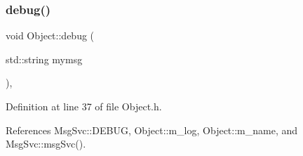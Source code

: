 \mbox{\label{classObject_aac010553f022165573714b7014a15f0d}} 
\subsubsection{\texorpdfstring{debug()}{debug()}\hspace{0.1cm}{\footnotesize\ttfamily [1/2]}}
{\footnotesize\ttfamily void Object\+::debug (\begin{DoxyParamCaption}\item[{std\+::string}]{mymsg }\end{DoxyParamCaption})\hspace{0.3cm}{\ttfamily [inline]}, {\ttfamily [inherited]}}



Definition at line 37 of file Object.\+h.



References Msg\+Svc\+::\+D\+E\+B\+UG, Object\+::m\+\_\+log, Object\+::m\+\_\+name, and Msg\+Svc\+::msg\+Svc().



